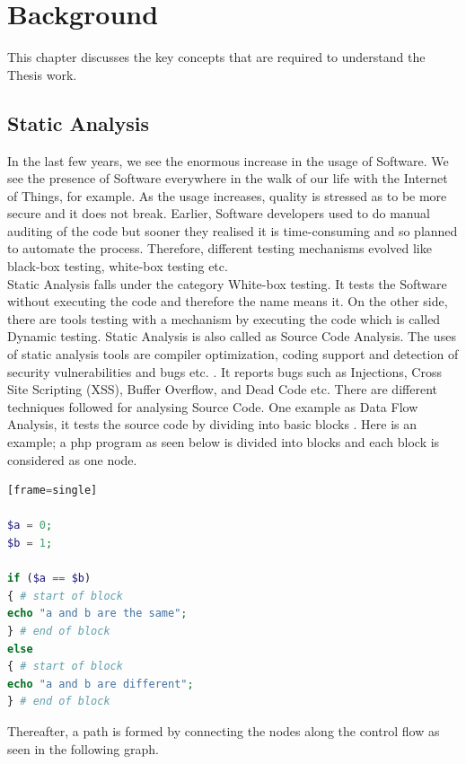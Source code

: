 \chapter{Background}
\label{ch:background}

This chapter discusses the key concepts that are required to understand the Thesis work.

\section{Static Analysis}

In the last few years, we see the enormous increase in the usage of Software. We see the presence of Software everywhere in the walk of our life with the Internet of Things, for example. As the usage increases, quality is stressed as to be more secure and it does not break. Earlier, Software developers used to do manual auditing of the code but sooner they realised it is time-consuming and so planned to automate the process. Therefore, different testing mechanisms evolved like black-box testing, white-box testing etc. \\

Static Analysis falls under the category White-box testing. It tests the Software without executing the code and therefore the name means it. On the other side, there are tools testing with a mechanism by executing the code which is called Dynamic testing. Static Analysis is also called as Source Code Analysis. The uses of static analysis tools are compiler optimization, coding support and detection of security vulnerabilities and bugs etc. \cite{deca}. It reports bugs such as Injections, Cross Site Scripting (XSS), Buffer Overflow, and Dead Code etc. \cite{bugs} There are different techniques followed for analysing Source Code. One example as Data Flow Analysis, it tests the source code by dividing into basic blocks \cite{Woegerer}. Here is an example; a php program as seen below is divided into blocks and each block is considered as one node.

\begin{lstlisting}[language=PHP][frame=single]

$a = 0;
$b = 1;

if ($a == $b)
{ # start of block
echo "a and b are the same";
} # end of block
else
{ # start of block
echo "a and b are different";
} # end of block


\end{lstlisting}

Thereafter, a path is formed by connecting the nodes along the control flow as seen in the following graph. \\

